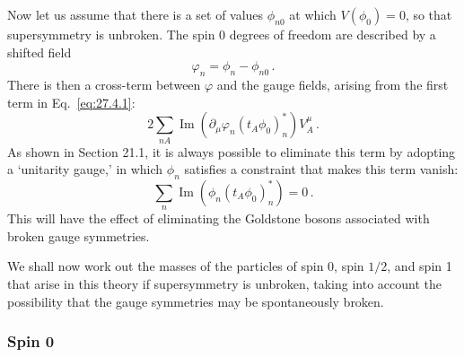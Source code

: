 Now let us assume that there is a set of values \(\phi_{n0}\) at which
\(V(\phi_0)=0\), so that supersymmetry is unbroken. The spin 0 degrees of
freedom are described by a shifted field
\begin{equation}
  \varphi_n=\phi_n-\phi_{n0}\,.
  \tag{27.4.13}\label{eq:27.4.13}
\end{equation}
There is then a cross-term between \(\varphi\) and the gauge fields, arising
from the first term in Eq.~\eqref{eq:27.4.1}:
\[
  2\sum_{nA}\operatorname{Im}
  \left(\partial_\mu\varphi_n(t_A\phi_0)_n^*\right)V_A^\mu\,.
\]
As shown in Section 21.1, it is always possible to eliminate this term by
adopting a `unitarity gauge,' in which \(\phi_n\) satisfies a constraint that
makes this term vanish:
\begin{equation}
  \sum_n\operatorname{Im}
  \left(\phi_n(t_A\phi_0)_n^*\right)=0\,.
  \tag{27.4.14}\label{eq:27.4.14}
\end{equation}
This will have the effect of eliminating the Goldstone bosons associated with
broken gauge symmetries.

We shall now work out the masses of the particles of spin 0, spin \(1/2\),
and spin 1 that arise in this theory if supersymmetry is unbroken, taking into
account the possibility that the gauge symmetries may be spontaneously
broken.

\subsubsection*{Spin 0}

